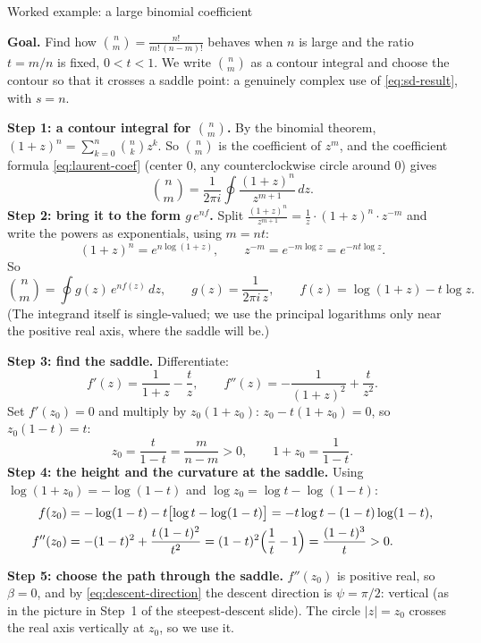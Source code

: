 \documentclass[11pt]{beamer}
\begin{document}
\begin{frame}[allowframebreaks=1.00]{Worked example: a large binomial coefficient}
\footnotesize

\textbf{Goal.} Find how \(\binom nm=\frac{n!}{m!\,(n-m)!}\) behaves when \(n\) is large and the ratio \(t=m/n\) is
fixed, \(0<t<1\). We write \(\binom nm\) as a contour integral and choose the contour so that it crosses a
saddle point: a genuinely complex use of \eqref{eq:sd-result}, with \(s=n\).

\textbf{Step 1: a contour integral for \(\binom nm\).} By the binomial theorem,
\((1+z)^n=\sum_{k=0}^{n}\binom nk z^k\). So \(\binom nm\) is the coefficient of \(z^m\), and the coefficient formula
\eqref{eq:laurent-coef} (center \(0\), any counterclockwise circle around \(0\)) gives
\[
  \binom nm=\frac1{2\pi i}\oint\frac{(1+z)^n}{z^{m+1}}\,dz .
\]
\textbf{Step 2: bring it to the form \(g\,e^{nf}\).} Split \(\frac{(1+z)^n}{z^{m+1}}=\frac1z\cdot(1+z)^n\cdot z^{-m}\) and write the
powers as exponentials, using \(m=nt\):
\[
  (1+z)^n=e^{n\log(1+z)},\qquad z^{-m}=e^{-m\log z}=e^{-nt\log z}.
\]
So
\[
  \binom nm=\oint g(z)\,e^{nf(z)}\,dz,
  \qquad
  g(z)=\frac{1}{2\pi i\,z},
  \qquad
  f(z)=\log(1+z)-t\log z .
\]
(The integrand itself is single-valued; we use the principal logarithms only near the positive real
axis, where the saddle will be.)
\par\framebreak\par
\textbf{Step 3: find the saddle.} Differentiate:
\[
  f'(z)=\frac1{1+z}-\frac t z,
  \qquad
  f''(z)=-\frac1{(1+z)^2}+\frac t{z^2}.
\]
Set \(f'(z_0)=0\) and multiply by \(z_0(1+z_0)\): \(z_0-t(1+z_0)=0\), so \(z_0(1-t)=t\):
\[
  z_0=\frac{t}{1-t}=\frac{m}{n-m}>0,\qquad 1+z_0=\frac{1}{1-t}.
\]
\textbf{Step 4: the height and the curvature at the saddle.} Using \(\log(1+z_0)=-\log(1-t)\) and
\(\log z_0=\log t-\log(1-t)\):
\begin{align*}
  f(z_0)
  &=-\log(1-t)-t\bigl[\log t-\log(1-t)\bigr]
   =-t\log t-(1-t)\log(1-t),\\
  f''(z_0)
  &=-(1-t)^2+\frac{t\,(1-t)^2}{t^2}
   =(1-t)^2\Bigl(\frac1t-1\Bigr)
   =\frac{(1-t)^3}{t}>0.
\end{align*}
\par\framebreak\par
\textbf{Step 5: choose the path through the saddle.} \(f''(z_0)\) is positive real, so \(\beta=0\), and by
\eqref{eq:descent-direction} the descent direction is \(\psi=\pi/2\): vertical (as in the picture in Step~1
of the steepest-descent slide). The circle \(|z|=z_0\) crosses the real axis vertically at \(z_0\), so we use it.

\end{frame}
\end{document}
